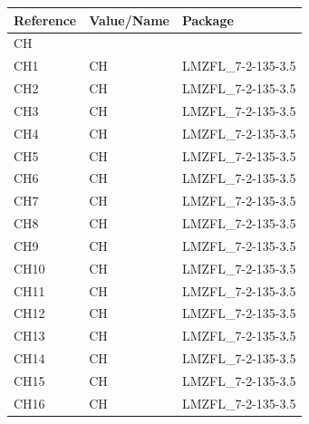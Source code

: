 \documentclass[paper=a4, open=any, numbers=noenddot]{scrbook}
\begin{document}
				\begin{longtabu}
					to \textwidth[l]{lX[-1]X}
					Reference & Value/Name             & Package                            \\ \hline\hline
					\endhead
					CH        &                        &                                    \\*
					CH1       & CH                     & LMZFL\_7-2-135-3.5                 \\
					CH2       & CH                     & LMZFL\_7-2-135-3.5                 \\
					CH3       & CH                     & LMZFL\_7-2-135-3.5                 \\
					CH4       & CH                     & LMZFL\_7-2-135-3.5                 \\
					CH5       & CH                     & LMZFL\_7-2-135-3.5                 \\
					CH6       & CH                     & LMZFL\_7-2-135-3.5                 \\
					CH7       & CH                     & LMZFL\_7-2-135-3.5                 \\
					CH8       & CH                     & LMZFL\_7-2-135-3.5                 \\
					CH9       & CH                     & LMZFL\_7-2-135-3.5                 \\
					CH10      & CH                     & LMZFL\_7-2-135-3.5                 \\
					CH11      & CH                     & LMZFL\_7-2-135-3.5                 \\
					CH12      & CH                     & LMZFL\_7-2-135-3.5                 \\
					CH13      & CH                     & LMZFL\_7-2-135-3.5                 \\
					CH14      & CH                     & LMZFL\_7-2-135-3.5                 \\
					CH15      & CH                     & LMZFL\_7-2-135-3.5                 \\
					CH16      & CH                     & LMZFL\_7-2-135-3.5                 \\
					\hline


\end{longtabu}
\end{document}
